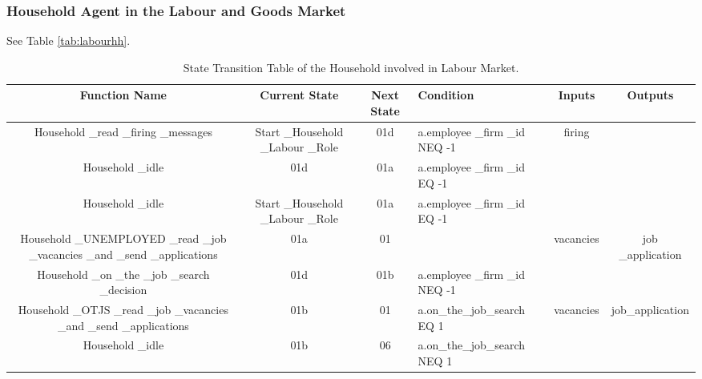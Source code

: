 \subsubsection{Household Agent in the Labour and Goods Market}

See Table \ref{tab:labourhh}.

\begin{landscape}
\begin{table}[!htb]\caption{State Transition Table of the Household involved in Labour Market.}
\begin{center}
\begin{tabular}{|c|c|c|l|c|c|}
\hline
Function Name & Current State & Next State & Condition & Inputs & Outputs\\
\hline

{\parbox[l]{5cm}{Household \_read \_firing \_messages}}&
{\parbox[l]{3cm}{Start \_Household \_Labour \_Role}}&
{\parbox[l]{3cm}{01d}}&{\parbox[l]{3cm}{a.employee \_firm \_id NEQ
-1}}
 & {\parbox[l]{3cm}{firing}}&
\\
\hline

{\parbox[l]{5cm}{Household \_idle}}& {\parbox[l]{3cm}{01d}}&
{\parbox[l]{3cm}{01a}}& {\parbox[l]{3cm}{a.employee \_firm \_id EQ
-1}}& &\\
\hline


{\parbox[l]{5cm}{Household \_idle}}& {\parbox[l]{3cm}{Start
\_Household \_Labour \_Role}}& {\parbox[l]{3cm}{01a}}&
{\parbox[l]{3cm}{a.employee \_firm \_id EQ -1}}& & \\
\hline



{\parbox[l]{5cm}{Household \_UNEMPLOYED \_read \_job \_vacancies
\_and \_send \_applications}}& {\parbox[l]{3cm}{01a}}&
{\parbox[l]{3cm}{01}}& & {\parbox[l]{3cm}{vacancies}}
 &{\parbox[l]{3cm}{job \_application}}
\\
\hline

{\parbox[l]{5cm}{Household \_on \_the \_job \_search \_decision}}&
{\parbox[l]{3cm}{01d}}&
{\parbox[l]{3cm}{01b}}&{\parbox[l]{3cm}{a.employee \_firm \_id NEQ
-1}}
 & &
\\
\hline

{\parbox[l]{5cm}{Household \_OTJS \_read \_job \_vacancies \_and
\_send \_applications}}& {\parbox[l]{3cm}{01b}}&
{\parbox[l]{3cm}{01}}&{\parbox[l]{3cm}{a.on\_the\_job\_search EQ
1}}&{\parbox[l]{3cm}{vacancies}}&
{\parbox[l]{3cm}{job\_application}}
\\
\hline


{\parbox[l]{5cm}{Household \_idle}}& {\parbox[l]{3cm}{01b}}&
{\parbox[l]{3cm}{06}}& {\parbox[l]{3cm}{a.on\_the\_job\_search NEQ
1}}&&
\\




\end{tabular}
\end{center}
\end{table}
\end{landscape}
